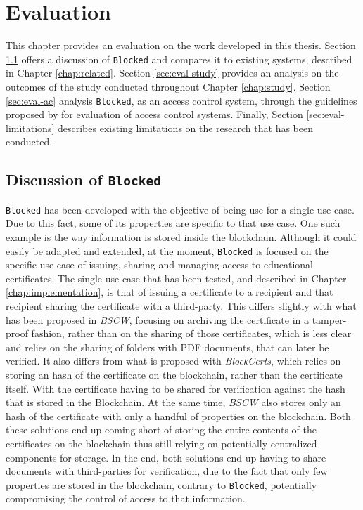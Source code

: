 \chapter{Evaluation}
\label{chap:evaluation}

This chapter provides an evaluation on the work developed in this thesis. Section \ref{sec:eval-analysis} offers a discussion of \texttt{Blocked} and compares it to existing systems, described in Chapter \ref{chap:related}. Section \ref{sec:eval-study} provides an analysis on the outcomes of the study conducted throughout Chapter \ref{chap:study}. Section \ref{sec:eval-ac} analysis \texttt{Blocked}, as an access control system, through the guidelines proposed by \citeauthor{hu_guidelines_2012} \cite{hu_guidelines_2012} for evaluation of access control systems. Finally, Section \ref{sec:eval-limitations} describes existing limitations on the research that has been conducted.

\section{Discussion of \texttt{Blocked}}
\label{sec:eval-analysis}

\texttt{Blocked} has been developed with the objective of being use for a single use case. Due to this fact, some of its properties are specific to that use case. One such example is the way information is stored inside the blockchain. Although it could easily be adapted and extended, at the moment, \texttt{Blocked} is focused on the specific use case of issuing, sharing and managing access to educational certificates. The single use case that has been tested, and described in Chapter \ref{chap:implementation}, is that of issuing a certificate to a recipient and that recipient sharing the certificate with a third-party. This differs slightly with what has been proposed in \emph{BSCW}, focusing on archiving the certificate in a tamper-proof fashion, rather than on the sharing of those certificates, which is less clear and relies on the sharing of folders with PDF documents, that can later be verified. It also differs from what is proposed with \emph{BlockCerts}, which relies on storing an hash of the certificate on the blockchain, rather than the certificate itself. With the certificate having to be shared for verification against the hash that is stored in the Blockchain. At the same time, \emph{BSCW} also stores only an hash of the certificate with only a handful of properties on the blockchain. Both these solutions end up coming short of storing the entire contents of the certificates on the blockchain thus still relying on potentially centralized components for storage. In the end, both solutions end up having to share documents with third-parties for verification, due to the fact that only few properties are stored in the blockchain, contrary to \texttt{Blocked}, potentially compromising the control of access to that information.

